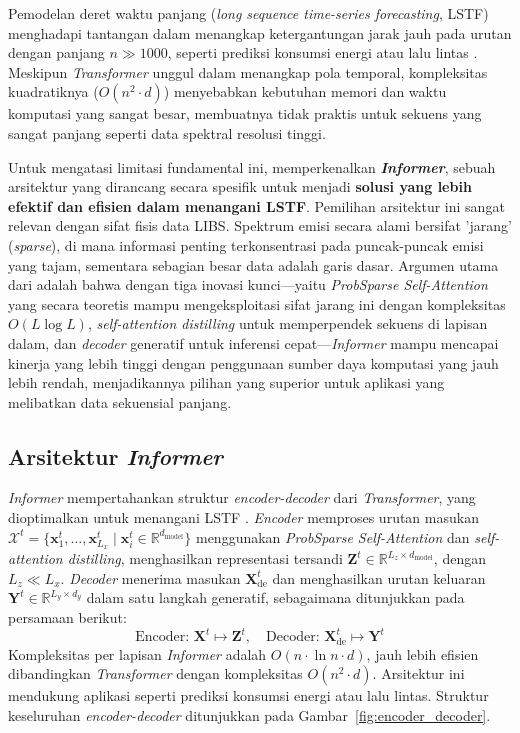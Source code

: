 Pemodelan deret waktu panjang (\textit{long sequence time-series forecasting}, LSTF) menghadapi tantangan dalam menangkap ketergantungan jarak jauh pada urutan dengan panjang \( n \gg 1000 \), seperti prediksi konsumsi energi atau lalu lintas \citep{Wu2021}. Meskipun \textit{Transformer} \citep{Vaswani2017} unggul dalam menangkap pola temporal, kompleksitas kuadratiknya (\( O(n^2 \cdot d) \)) menyebabkan kebutuhan memori dan waktu komputasi yang sangat besar, membuatnya tidak praktis untuk sekuens yang sangat panjang seperti data spektral resolusi tinggi. 

Untuk mengatasi limitasi fundamental ini, \citet{Zhou2021} memperkenalkan \textbf{\textit{Informer}}, sebuah arsitektur yang dirancang secara spesifik untuk menjadi \textbf{solusi yang lebih efektif dan efisien dalam menangani LSTF}. Pemilihan arsitektur ini sangat relevan dengan sifat fisis data LIBS. Spektrum emisi secara alami bersifat 'jarang' (\textit{sparse}), di mana informasi penting terkonsentrasi pada puncak-puncak emisi yang tajam, sementara sebagian besar data adalah garis dasar. Argumen utama dari \textcite{Zhou2021} adalah bahwa dengan tiga inovasi kunci—yaitu \textit{ProbSparse Self-Attention} yang secara teoretis mampu mengeksploitasi sifat jarang ini dengan kompleksitas \( O(L \log L) \), \textit{self-attention distilling} untuk memperpendek sekuens di lapisan dalam, dan \textit{decoder} generatif untuk inferensi cepat—\textit{Informer} mampu mencapai kinerja yang lebih tinggi dengan penggunaan sumber daya komputasi yang jauh lebih rendah, menjadikannya pilihan yang superior untuk aplikasi yang melibatkan data sekuensial panjang.

\subsection{Arsitektur \textit{Informer}}

\textit{Informer} mempertahankan struktur \textit{encoder-decoder} dari \textit{Transformer}, yang dioptimalkan untuk menangani LSTF \citep{Zhou2021}. \textit{Encoder} memproses urutan masukan \( \mathcal{X}^t = \{ \mathbf{x}_1^t, \ldots, \mathbf{x}_{L_x}^t \mid \mathbf{x}_i^t \in \mathbb{R}^{d_{\text{model}}} \} \) menggunakan \textit{ProbSparse Self-Attention} dan \textit{self-attention distilling}, menghasilkan representasi tersandi \( \mathbf{Z}^t \in \mathbb{R}^{L_z \times d_{\text{model}}} \), dengan \( L_z \ll L_x \). \textit{Decoder} menerima masukan \( \mathbf{X}_{\text{de}}^t \) dan menghasilkan urutan keluaran \( \mathbf{Y}^t \in \mathbb{R}^{L_y \times d_y} \) dalam satu langkah generatif, sebagaimana ditunjukkan pada persamaan berikut:
\begin{equation}
\text{Encoder: } \mathbf{X}^t \mapsto \mathbf{Z}^t, \quad \text{Decoder: } \mathbf{X}_{\text{de}}^t \mapsto \mathbf{Y}^t \label{eq:bab2_eq43}
\end{equation}
Kompleksitas per lapisan \textit{Informer} adalah \( O(n \cdot \ln n \cdot d) \), jauh lebih efisien dibandingkan \textit{Transformer} dengan kompleksitas \( O(n^2 \cdot d) \). Arsitektur ini mendukung aplikasi seperti prediksi konsumsi energi atau lalu lintas. Struktur keseluruhan \textit{encoder-decoder} ditunjukkan pada Gambar~\ref{fig:encoder_decoder}.

